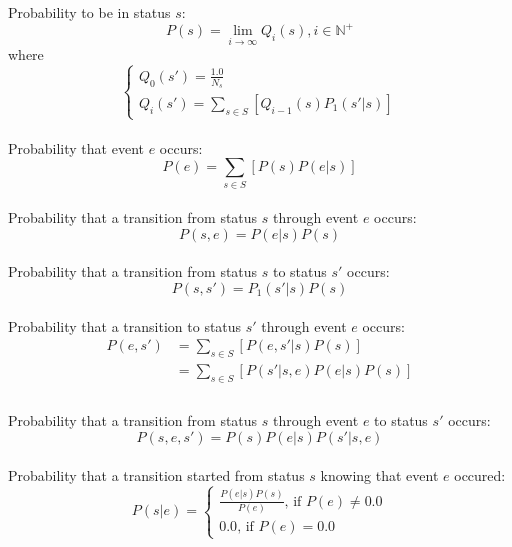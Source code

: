 \documentclass[12pt, a4paper]{article}
\begin{document}
Probability to be in status $s$:\\
\begin{equation}
P(s)=\lim_{i\rightarrow\infty}Q_i(s),i\in\mathbb{N}^+
\end{equation}
where
$$
\left\lbrace
\begin{array}{l}
Q_0(s')=\frac{1.0}{N_s}\\
Q_i(s')=\sum_{s\in S}\left[Q_{i-1}(s)P_1(s'|s)\right]
\end{array}
\right.
$$\\

Probability that event $e$ occurs:\\
\begin{equation}
P(e)=\sum_{s\in S}\left[P(s)P(e|s)\right]
\end{equation}\\

Probability that a transition from status $s$ through event $e$ occurs:\\
\begin{equation}
P(s,e)=P(e|s)P(s)
\end{equation}\\

Probability that a transition from status $s$ to status $s'$ occurs:\\
\begin{equation}
P(s,s')=P_1(s'|s)P(s)
\end{equation}\\

Probability that a transition to status $s'$ through event $e$ occurs:\\
\begin{equation}
\begin{array}{ll}
P(e,s')&=\sum_{s\in S}\left[P(e,s'|s)P(s)\right]\\
&=\sum_{s\in S}\left[P(s'|s,e)P(e|s)P(s)\right]\\
\end{array}
\end{equation}\\

Probability that a transition from status $s$ through event $e$ to status $s'$ occurs:\\
\begin{equation}
P(s,e,s')=P(s)P(e|s)P(s'|s,e)
\end{equation}\\

Probability that a transition started from status $s$ knowing that event $e$ occured:\\
\begin{equation}
P(s|e)=
\left\lbrace
\begin{array}{l}
\frac{P(e|s)P(s)}{P(e)}\textrm{, if }P(e) \neq 0.0\\
0.0\textrm{, if }P(e) = 0.0
\end{array}
\right.
\end{equation}\\
\end{document}
